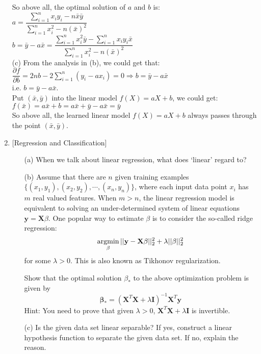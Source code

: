 \documentclass[10pt]{article}
\begin{document}
\begin{enumerate}[1.]
So above all, the optimal solution of $a$ and $b$ is:\\
$a=\dfrac{\sum\limits_{i=1}^nx_iy_i-n\bar{x}\bar{y}}{\sum\limits_{i=1}^nx_i^2-n(\bar{x})^2}$\\
$b=\bar{y}-a\bar{x}=\dfrac{\sum\limits_{i=1}^nx_i^2\bar{y}-\sum\limits_{i=1}^nx_iy_i\bar{x}}{\sum\limits_{i=1}^nx_i^2-n(\bar{x})^2}$\\

(c) From the analysis in (b), we could get that:\\
$\dfrac{\partial f}{\partial b}=2nb-2\sum\limits_{i=1}^n(y_i-ax_i)=0\Rightarrow b=\bar{y}-a\bar{x}$\\
i.e. $b=\bar{y}-a\bar{x}$.\\

Put $(\bar{x},\bar{y})$ into the linear model $f(X)=aX+b$, we could get:\\
$f(\bar{x})=a\bar{x}+b=a\bar{x}+\bar{y}-a\bar{x}=\bar{y}$\\

So above all, the learned linear model $f(X)=aX+b$ always passes through the point $(\bar{x},\bar{y})$.\\

	      \newpage

	\item {} [Regression and Classification]
	      \begin{itemize}
			\item[(a)] When we talk about linear regression, what does `linear' regard to? 
			\item[(b)] Assume that there are $n$ given training examples $\{(x_1, y_1), (x_2, y_2), \cdots, (x_n, y_n)\}$,
			where each input data point $x_i$ has $m$ real valued features. When $m > n$, the linear regression model
			is equivalent to solving an under-determined system of linear equations $\mathbf{y} = \mathbf{X}\beta$. One popular way to
			estimate $\beta$ is to consider the so-called ridge regression:
			\[\mathop{\rm argmin}_{\beta} ||\mathbf{y}-\mathbf{X}\mathbf{\beta}||_2^2 + \lambda||\beta||_2^2\]
			for some $\lambda > 0$. This is also known as Tikhonov regularization.
			
			Show that the optimal solution $\beta_*$ to the above optimization problem is given by
			\[\mathbf{\beta}_* = (\mathbf{X}^T\mathbf{X} + \lambda \mathbf{I})^{-1}\mathbf{X}^T\mathbf{y}\]
			Hint: You need to prove that given $\lambda>0$, $\mathbf{X}^T\mathbf{X} + \lambda \mathbf{I}$ is invertible. 
			\item[(c)] Is the given data set linear separable? If yes, construct a linear hypothesis function to separate the given data set. If no, explain the reason. 
			

\end{itemize}
\end{enumerate}
\end{document}
